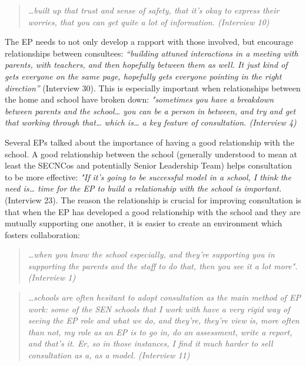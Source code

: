 \documentclass[
]{article}
\begin{document}
\begin{quote}
\emph{\ldots built up that trust and sense of safety, that it's okay to
express their worries, that you can get quite a lot of information.
(Interview 10)}
\end{quote}

The EP needs to not only develop a rapport with those involved, but
encourage relationships between consultees: \emph{``building attuned
interactions in a meeting with parents, with teachers, and then
hopefully between them as well. It just kind of gets everyone on the
same page, hopefully gets everyone pointing in the right direction''}
(Interview 30). This is especially important when relationships between
the home and school have broken down: \emph{"sometimes you have a
breakdown between parents and the school\ldots{} you can be a person in
between, and try and get that working through that\ldots{} which
is\ldots{} a key feature of consultation. (Interview 4)}

Several EPs talked about the importance of having a good relationship
with the school. A good relationship between the school (generally
understood to mean at least the SECNCos and potentially Senior
Leadership Team) helps consultation to be more effective: \emph{"If it's
going to be successful model in a school, I think the need is\ldots{}
time for the EP to build a relationship with the school is important.}
(Interview 23). The reason the relationship is crucial for improving
consultation is that when the EP has developed a good relationship with
the school and they are mutually supporting one another, it is easier to
create an environment which fosters collaboration:

\begin{quote}
\emph{\ldots when you know the school especially, and they're supporting
you in supporting the parents and the staff to do that, then you see it
a lot more". (Interview 1)}
\end{quote}

\begin{quote}
\emph{\ldots schools are often hesitant to adopt consultation as the
main method of EP work: some of the SEN schools that I work with have a
very rigid way of seeing the EP role and what we do, and they're,
they're view is, more often than not, my role as an EP is to go in, do
an assessment, write a report, and that's it. Er, so in those instances,
I find it much harder to sell consultation as a, as a model. (Interview
11)}
\end{quote}
\end{document}
